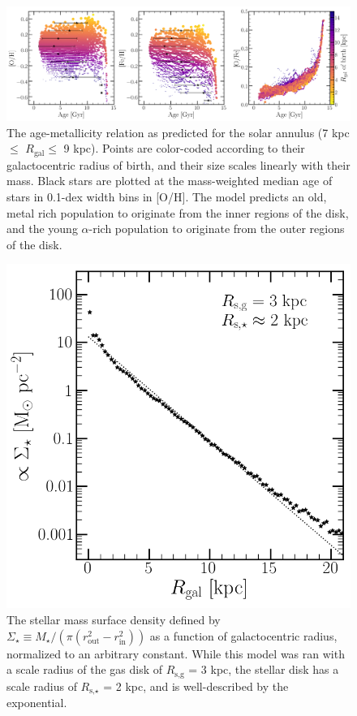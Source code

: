 \documentclass[12pt]{report}
\begin{document}
\begin{figure}[!h] 
\centering 
\includegraphics[scale = 0.3]{../plots/age-metallicity/moddisk_vigorousSF.png} 
\caption{
The age-metallicity relation as predicted for the solar annulus (7 kpc $\leq$ 
$R_\text{gal} \leq$ 9 kpc). Points are color-coded according to their 
galactocentric radius of birth, and their size scales linearly with their 
mass. Black stars are plotted at the mass-weighted median age of stars in 
0.1-dex width bins in [O/H]. The model predicts an old, metal rich population 
to originate from the inner regions of the disk, and the young $\alpha$-rich 
population to originate from the outer regions of the disk. 
}
\end{figure}

\begin{figure}[!h] 
\centering 
\includegraphics[scale = 0.5]{../plots/gradients/stellar_surface_density/moddisk_vigorousSF.png} 
\caption{
The stellar mass surface density defined by 
$\Sigma_\star \equiv M_\star / (\pi(r_\text{out}^2 - r_\text{in}^2))$ as a 
function of galactocentric radius, normalized to an arbitrary constant. While 
this model was ran with a scale radius of the gas disk of $R_\text{s,g}$ = 3 
kpc, the stellar disk has a scale radius of $R_{\text{s,}\star}$ = 2 kpc, and 
is well-described by the exponential. 
}
\end{figure}
\end{document}
